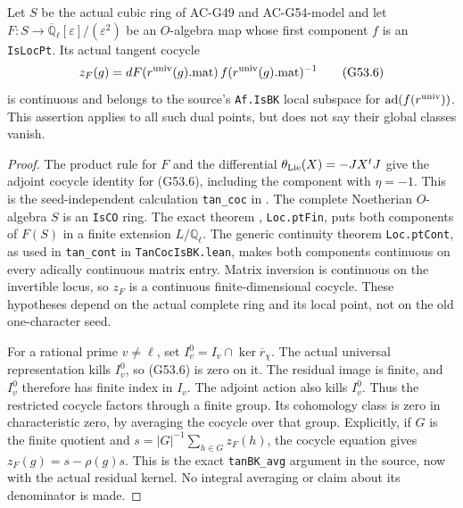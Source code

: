 \begin{proposition}
\label{AC-G53-BK}
Let $S$ be the actual cubic ring of AC-G49 and AC-G54-model and let
$F:S\to\overline{\mathbb Q}_\ell[\varepsilon]/(\varepsilon^2)$
be an $O$-algebra map whose first component $f$ is an
\texttt{IsLocPt}.  Its actual tangent cocycle
\[
 z_F(g)=dF(r^{\rm univ}(g).\mathrm{mat})\,
                   f(r^{\rm univ}(g).\mathrm{mat})^{-1}
                                                               \tag{G53.6}
\]
is continuous and belongs to the source's
\texttt{Af.IsBK} local subspace for
$\operatorname{ad}(f(r^{\rm univ}))$.
This assertion applies to all such dual points,
but does not say their global classes vanish.
\end{proposition}
\begin{proof}
The product rule for $F$ and the differential
$\theta_{\rm Lie}(X)=-JX^tJ$ give the adjoint cocycle
identity for (G53.6), including the component with
$\eta=-1$.  This is the seed-independent calculation
\texttt{tan\_coc} in
.
The complete Noetherian $O$-algebra $S$ is an
\texttt{IsCO} ring.  The exact theorem
, \texttt{Loc.ptFin},
puts both components of $F(S)$ in a finite extension
$L/\mathbb Q_\ell$.  The generic continuity theorem
\texttt{Loc.ptCont}, as used in \texttt{tan\_cont} in
\texttt{TanCocIsBK.lean}, makes both components continuous
on every adically continuous matrix entry.  Matrix
inversion is continuous on the invertible locus, so
$z_F$ is a continuous finite-dimensional cocycle.
These hypotheses depend on the actual complete ring
and its local point, not on the old one-character seed.

For a rational prime $v\ne\ell$, set
$I_v^0=I_v\cap\ker\overline r_\chi$.
The actual universal representation kills $I_v^0$,
so (G53.6) is zero on it.  The residual image is finite,
and $I_v^0$ therefore has finite index in $I_v$.
The adjoint action also kills $I_v^0$.
Thus the restricted cocycle factors through a finite
group.  Its cohomology class is zero in characteristic
zero, by averaging the cocycle over that group.
Explicitly, if $G$ is the finite quotient and
$s=|G|^{-1}\sum_{h\in G}z_F(h)$, the cocycle equation
gives $z_F(g)=s-\rho(g)s$.
This is the exact \texttt{tanBK\_avg} argument in the
source, now with the actual residual kernel.
No integral averaging or claim about its denominator
is made.


\end{proof}
